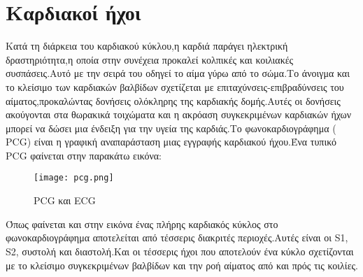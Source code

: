 \section{Καρδιακοί ήχοι}
Κατά τη διάρκεια του καρδιακού κύκλου,η καρδιά παράγει ηλεκτρική δραστηριότητα,η
οποία στην συνέχεια προκαλεί κολπικές και κοιλιακές συσπάσεις.Αυτό με την σειρά
του οδηγεί το αίμα γύρω από το σώμα.Το άνοιγμα και το κλείσιμο των καρδιακών
βαλβίδων σχετίζεται με επιταχύνσεις-επιβραδύνσεις του αίματος,προκαλώντας
δονήσεις ολόκληρης της καρδιακής δομής.Αυτές οι δονήσεις ακούγονται στα θωρακικά
τοιχώματα και η ακρόαση συγκεκριμένων καρδιακών ήχων μπορεί να δώσει μια ένδειξη
για την υγεία της καρδιάς.Το φωνοκαρδιογράφημα ( PCG) είναι η γραφική
αναπαράσταση μιας εγγραφής καρδιακού ήχου.Ένα τυπικό PCG φαίνεται στην παρακάτω
εικόνα:

\begin{figure}[H]
	\texttt{[image: pcg.png]}
	\caption{PCG και ECG}
	\label{PCG}
\end{figure}

Όπως φαίνεται και στην εικόνα ένας πλήρης καρδιακός κύκλος στο
φωνοκαρδιογράφημα αποτελείται από τέσσερις διακριτές περιοχές.Αυτές είναι οι
S1, S2, συστολή και διαστολή.Και οι τέσσερις ήχοι που αποτελούν ένα κύκλο
σχετίζονται με το κλείσιμο συγκεκριμένων βαλβίδων και την ροή αίματος από και
πρός τις κοιλίες.

